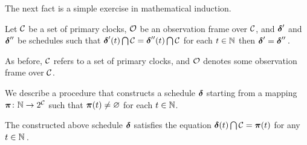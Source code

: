 The next fact is a simple exercise in mathematical induction.
\begin{proposition}
Let $\clocks$ be a set of primary clocks, $\clocks[o]$ be an observation frame over $\clocks$, and $\boldsymbol{\delta}'$ and $\boldsymbol{\delta}''$ be schedules such that $\dELTA'(t)\bigcap\clocks=\dELTA''(t)\bigcap\clocks$ for each $t\in\nat$ then $\boldsymbol{\delta}'=\boldsymbol{\delta}''$\,.
\end{proposition}
As before, $\clocks$ refers to a set of primary clocks, and $\clocks[o]$ denotes some observation frame over $\clocks$.
\par\noindent
We describe a procedure that constructs a schedule $\boldsymbol{\delta}$ starting from a mapping $\pI\colon\nat\to 2^{\clocks}$ such that $\boldsymbol{\pi}(t)\neq\varnothing$ for each $t\in\nat$.
\begin{proposition}
The constructed above schedule $\boldsymbol{\delta}$ satisfies the equation $\dELTA(t)\bigcap\clocks=\pI(t)$ for any $t\in\nat$\,.
\end{proposition}